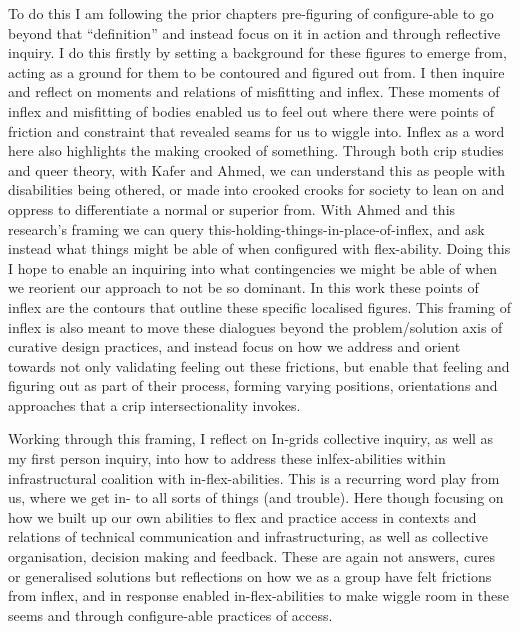To do this I am following the prior chapters pre-figuring of
configure-able to go beyond that ``definition'' and instead focus on it
in action and through reflective inquiry. I do this firstly by setting a
background for these figures to emerge from, acting as a ground for them
to be contoured and figured out from. I then inquire and reflect on
moments and relations of misfitting and inflex. These moments of inflex
and misfitting of bodies enabled us to feel out where there were points
of friction and constraint that revealed seams for us to wiggle into.
Inflex as a word here also highlights the making crooked of something.
Through both crip studies and queer theory, with Kafer and Ahmed, we can
understand this as people with disabilities being othered, or made into
crooked crooks for society to lean on and oppress to differentiate a
normal or superior from. With Ahmed and this research's framing we can
query this-holding-things-in-place-of-inflex, and ask instead what
things might be able of when configured with flex-ability. Doing this I
hope to enable an inquiring into what contingencies we might be able of
when we reorient our approach to not be so dominant. In this work these
points of inflex are the contours that outline these specific localised
figures. This framing of inflex is also meant to move these dialogues
beyond the problem/solution axis of curative design practices, and
instead focus on how we address and orient towards not only validating
feeling out these frictions, but enable that feeling and figuring out as
part of their process, forming varying positions, orientations and
approaches that a crip intersectionality invokes.

Working through this framing, I reflect on In-grids collective inquiry,
as well as my first person inquiry, into how to address these
inlfex-abilities within infrastructural coalition with
in-flex-abilities. This is a recurring word play from us, where we get
in- to all sorts of things (and trouble). Here though focusing on how we
built up our own abilities to flex and practice access in contexts and
relations of technical communication and infrastructuring, as well as
collective organisation, decision making and feedback. These are again
not answers, cures or generalised solutions but reflections on how we as
a group have felt frictions from inflex, and in response enabled
in-flex-abilities to make wiggle room in these seems and through
configure-able practices of access.
